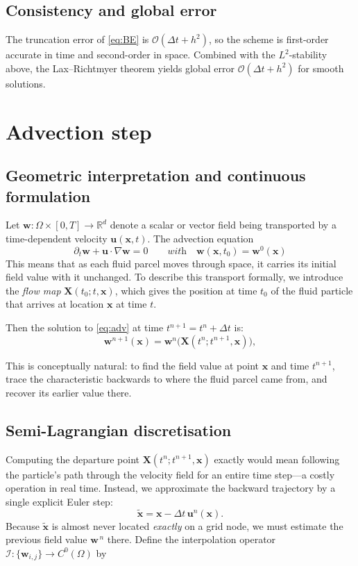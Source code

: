 \documentclass[11pt]{article}
\begin{document}
\subsection{Consistency and global error}
The truncation error of \eqref{eq:BE} is
$\mathcal{O}(\Delta t + h^{2})$, so the scheme is
first-order accurate in time and second-order in space.  Combined with
the $L^{2}$-stability above, the Lax–Richtmyer theorem yields global
error $\mathcal{O}(\Delta t + h^{2})$ for smooth solutions.



\section{Advection step}\label{sec:advection}

\subsection{Geometric interpretation and continuous formulation}
Let $\bm{w}:\Omega\times[0,T]\to\mathbb{R}^{d}$ denote a scalar or
vector field being transported by a time-dependent velocity
$\bm{u}(\bm{x},t)$. The advection equation
\begin{equation}\label{eq:adv}
  \partial_t \bm{w} + \bm{u}\cdot\nabla \bm{w} = 0
  \qquad\textit{with} \quad
  \bm{w}(\bm{x},t_0) = \bm{w}^0(\bm{x})
\end{equation}
This means that as each fluid parcel moves through space, it carries its initial field value with it unchanged.
To describe this transport formally, we introduce the \emph{flow map}
$\bm{X}(t_0; t, \bm{x})$, which gives the position at time $t_0$
of the fluid particle that arrives at location $\bm{x}$ at time $t$.

Then the solution to \eqref{eq:adv} at time $t^{n+1} = t^n + \Delta t$ is:
\begin{equation}\label{eq:adv-exact}
  \bm{w}^{n+1}(\bm{x}) =
  \bm{w}^n\!\bigl(\bm{X}(t^n; t^{n+1}, \bm{x})\bigr),
\end{equation}

This is conceptually natural: to find the field value at point
$\bm{x}$ and time $t^{n+1}$, trace the characteristic backwards to
where the fluid parcel came from, and recover its earlier value there.

\subsection{Semi-Lagrangian discretisation}
Computing the departure point $\bm{X}(t^n; t^{n+1}, \bm{x})$ exactly
would mean following the particle’s path through the velocity field for an
entire time step—a costly operation in real time. Instead, we approximate the backward trajectory by a single
explicit Euler step:
\[
  \tilde{\bm{x}} = \bm{x} - \Delta t\, \bm{u}^{n}(\bm{x}).
\]
Because $\tilde{\bm{x}}$ is almost never located \emph{exactly} on a
grid node, we must estimate the previous field value
$\bm{w}^{\,n}$ there.  Define the interpolation operator
\(\mathcal{I} : \bigl\{\bm{w}_{i,j}\bigr\}\!\to C^{0}(\Omega)\) by
\end{document}
